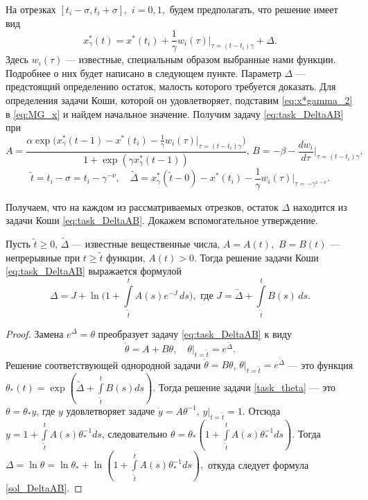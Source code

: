 На отрезках $[t_i - \sigma, t_i + \sigma],$ $i=0, 1,$ будем предполагать, что решение имеет вид
%
\begin{equation}
    \label{eq:x*gamma_2}
    x^*_\gamma(t)=x^*(t_i)+\frac{1}{\gamma}w_i(\tau)|_{\tau=(t-t_i)\gamma}+\Delta.
\end{equation}
%
Здесь $w_i(\tau)$ --- известные, специальным образом выбранные нами функции. Подробнее о них будет написано в следующем пункте. Параметр $\Delta$ --- предстоящий определению остаток, малость которого требуется доказать. Для определения задачи Коши, которой он удовлетворяет, подставим \eqref{eq:x*gamma_2} в \eqref{eq:MG_x} и найдем начальное значение. Получим задачу \eqref{eq:task_DeltaAB} при
\begin{equation}
    \label{AB_eq:x*gamma_2}
    A=\frac{\alpha\exp\big(x_{\gamma}^*(t-1)-x^*(t_i)-\frac{1}{\gamma}w_i(\tau)|_{\tau=(t-t_i)\gamma}\big)}{1+\exp(\gamma x_{\gamma}^*(t-1))},
    \,
    B=-\beta-\frac{dw_i}{d\tau}\Big|_{\tau=(t-t_i)\gamma},
\end{equation}
%
\begin{equation}\label{tilde_eq:x*gamma_2}
    \tilde{t} = t_i - \sigma = t_i - \gamma^{-\nu},\quad \tilde{\Delta}=x_{\gamma}^*(\tilde{t} - 0) - x^*(t_i) -\frac{1}{\gamma} w_i(\tau)|_{\tau = -\gamma^{1 - \nu}}.
\end{equation}

Получаем, что на каждом из рассматриваемых отрезков, остаток $\Delta$ находится из задачи Коши \eqref{eq:task_DeltaAB}. Докажем вспомогательное утверждение.

\begin{lemma}\label{lm:DeltaAB}
Пусть $\tilde{t} \geqslant 0$, $\tilde{\Delta}$ --- известные вещественные числа, $A = A(t),$ $B = B(t)$ --- непрерывные при $t \geq \tilde{t}$ функции, $A(t) > 0$. Тогда решение задачи Коши \eqref{eq:task_DeltaAB} выражается формулой
	\begin{equation}\label{sol_DeltaAB}
	\Delta = J + \ln\Big(1 + \int\limits_{\tilde{t}}^{t} A(s) e^{-J}\,ds \Big),
	\text{ где } J = \tilde{\Delta} + \int\limits_{\tilde{t}}^{t} B(s)\,ds.
	\end{equation}
\end{lemma}
\begin{proof}
    Замена $e^{\Delta}=\theta$ преобразует задачу \eqref{eq:task_DeltaAB} к виду
    \begin{equation}\label{task_theta}
		\dot{\theta}=A+B\theta,\quad\theta|_{t=\tilde{t}}=e^{\tilde{\Delta}}.
    \end{equation}
    Решение соответствующей однородной задачи $\dot{\theta}=B\theta$, $\theta|_{t=\tilde{t}}=e^{\tilde{\Delta}}$ --- это функция $\theta_*(t)=\exp(\tilde{\Delta}+\int\limits_{\tilde{t}}^{t}B(s)ds).$ Тогда решение задачи \eqref{task_theta} --- это $\theta=\theta_* y$, где $y$ удовлетворяет задаче $\dot{y} = A \theta^{-1}$, $y|_{t=\tilde{t}} = 1$. Отсюда $y = 1 + \int\limits_{\tilde{t}}^{t}A(s)\theta_*^{-1}ds$, следовательно $\theta=\theta_*(1+\int\limits_{\tilde{t}}^{t}A(s)\theta_*^{-1}ds)$.
    Тогда $\Delta=\ln\theta=\ln\theta_*+\ln(1+\int\limits_{\tilde{t}}^{t}A(s)\theta_*^{-1}ds),$ откуда следует формула \eqref{sol_DeltaAB}.
\end{proof}

